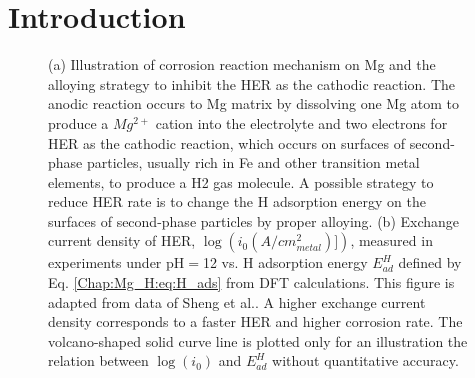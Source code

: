 \section{Introduction}

\begingroup
\begin{figure}[!ht]
  \centering
  \label{Chap:Mg_H:fig:1a}
  \label{Chap:Mg_H:fig:1b}
\caption[Illustration of corrosion reaction mechanism on Mg and the alloying strategy to inhibit \ac{HER}]{(a) Illustration of corrosion reaction mechanism on Mg and the alloying strategy to inhibit the \ac{HER} as the cathodic reaction. The anodic reaction occurs to Mg matrix by dissolving one Mg atom to produce a $Mg^{2+}$ cation into the electrolyte and two electrons for HER as the cathodic reaction, which occurs on surfaces of second-phase particles, usually rich in Fe and other transition metal elements, to produce a H2 gas molecule. A possible strategy to reduce \ac{HER} rate is to change the H adsorption energy on the surfaces of second-phase particles by proper alloying. (b) Exchange current density of \ac{HER}, $\log(i_0(A/cm^2_{metal})])$, measured in experiments under pH$=$12 vs. H adsorption energy $E_{ad}^H$ defined by Eq. \ref{Chap:Mg_H:eq:H_ads} from \ac{DFT} calculations. This figure is adapted from data of Sheng et al.\cite{sheng2013correlating}. A higher exchange current density corresponds to a faster \ac{HER} and higher corrosion rate. The volcano-shaped solid curve line is plotted only for an illustration the relation between $\log(i_0)$ and $E_{ad}^H$ without quantitative accuracy.}
  \label{Chap:Mg_H:fig1}
\end{figure}
\endgroup


